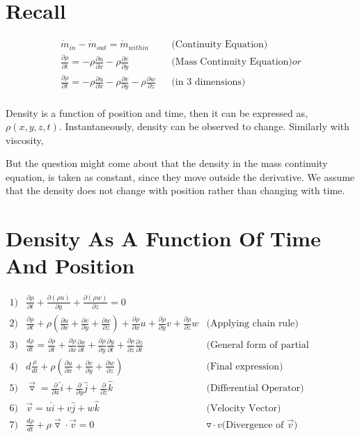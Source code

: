 \documentclass{report}
\begin{document}
\section{Recall}
\begin{align*}
  \dot{m}_{in} - \dot{m}_{out} = \dot{m}_{within} & &\text{(Continuity Equation)} \\
  \frac{\partial \rho}{\partial t} = -\rho \frac{\partial u}{\partial x} - \rho \frac{\partial v}{\partial y} & &\text{(Mass Continuity Equation)} or \\
  \frac{\partial \rho}{\partial t} = -\rho \frac{\partial u}{\partial x} - \rho \frac{\partial v}{\partial y} -\rho \frac{\partial w}{\partial z} & &\text{(in 3 dimensions)} \\
\end{align*}

Density is a function of position and time, then it can be expressed as, $\rho(x,y,z,t)$. Instantaneously, density can be observed to change. Similarly with viscosity,

But the question might come about that the density in the mass continuity equation, is taken as constant, since they move outside the derivative. We assume that the density does not change with position rather than changing with time.

\section{Density As A Function Of Time And Position}
\begin{align*}
  1) &\frac{\partial \rho}{\partial t} + \frac{\partial (\rho u)}{\partial y} + \frac{\partial (\rho w)}{\partial z} = 0 \\
  2) &\frac{\partial \rho}{\partial t} + \rho (\frac{\partial u}{\partial x} + \frac{\partial v}{\partial y} + \frac{\partial w}{\partial z}) + \frac{\partial \rho}{\partial x} u + \frac{\partial \rho}{\partial y}v + \frac{\partial \rho}{\partial z} w &\text{(Applying chain rule)} \\
  3) &\frac{d \rho}{dt} = \frac{\partial \rho}{\partial t} + \frac{\partial \rho}{\partial x}\frac{\partial x}{\partial t} + \frac{\partial \rho}{\partial y}\frac{\partial y}{\partial t} + \frac{\partial \rho}{\partial z}\frac{\partial z}{\partial t} &\text{(General form of partial derivatives to total derivatives)} \\
  4) & d\frac{\rho}{dt} + \rho(\frac{\partial u}{\partial x} + \frac{\partial v}{\partial y} + \frac{\partial w}{\partial z}) &\text{(Final expression)} \\
  5) & \vec{\triangledown}  = \frac{\partial }{\partial x} \hat{i} + \frac{\partial }{\partial y} \hat{j} + \frac{\partial }{\partial z} \hat{k} &\text{(Differential Operator)} \\
  6) &\vec{v} = u \hat{i} + v \hat{j} + w \hat{k} &\text{(Velocity Vector)} \\
  7)&\frac{d \rho}{dt} + \rho \vec{\triangledown}\cdot{\vec{v}} = 0 &{\triangledown \cdot v \text{(Divergence of $\vec{v}$)}}
\end{align*}
\end{document}
